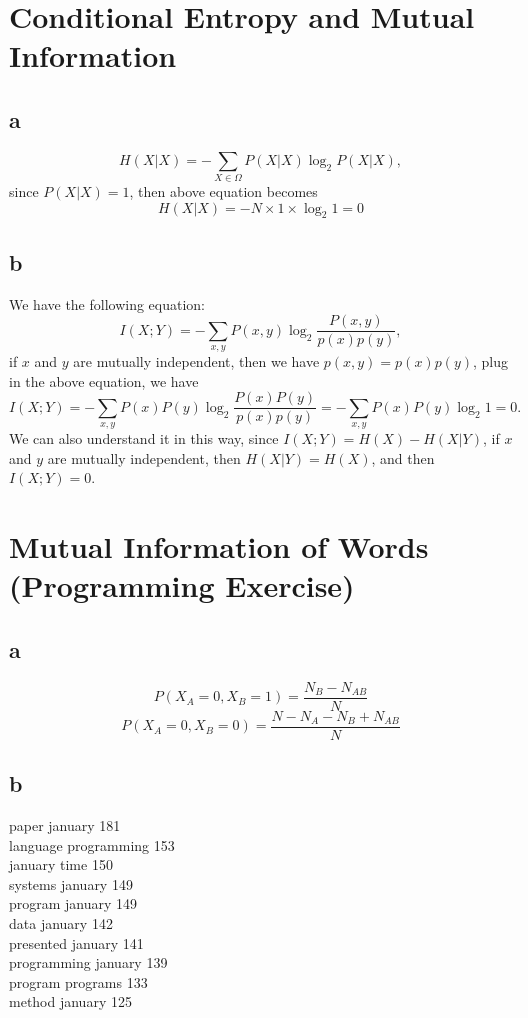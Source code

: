 \section{Conditional Entropy and Mutual Information}
\subsection{a}
\begin{equation}
H(X|X) = -\sum_{X\in\Omega}P(X|X)\log_2 P(X|X),
\end{equation}
since $P(X|X)=1$, then above equation becomes 
\begin{equation}
H(X|X) = -N\times1\times\log_2 1=0
\end{equation}

\subsection{b}
We have the following equation:
\begin{equation}
I(X;Y) = -\sum_{x,y}P(x,y)\log_2 \frac{P(x,y)}{p(x)p(y)},
\end{equation}
if $x$ and $y$ are mutually independent, then we have $p(x,y)=p(x)p(y)$, plug in the above equation, we have
\begin{equation}
I(X;Y) = -\sum_{x,y}P(x)P(y)\log_2 \frac{P(x)P(y)}{p(x)p(y)}= -\sum_{x,y}P(x)P(y)\log_2 1=0.
\end{equation}
We can also understand it in this way, since $I(X;Y) = H(X) - H(X|Y)$, if $x$ and $y$ are mutually independent, then $H(X|Y)=H(X)$, and then $I(X;Y) =0$.


\section{Mutual Information of Words (Programming Exercise)}
\subsection{a}
\begin{equation}
P(X_A=0,X_B=1)=\frac{N_B-N_{AB}}{N}
\end{equation}
\begin{equation}
P(X_A=0,X_B=0)=\frac{N-N_A-N_B+N_{AB}}{N}
\end{equation}

\subsection{b}
paper january 181 \\
language programming 153 \\
january time 150 \\
systems january 149 \\
program january 149 \\
data january 142 \\
presented january 141 \\
programming january 139 \\
program programs 133 \\
method january 125 \\

